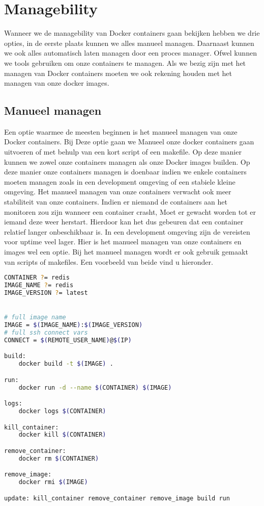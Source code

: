 \chapter{Managebility}

Wanneer we de managebility van Docker containers gaan bekijken hebben we drie opties, in de eerste plaats kunnen we alles manueel managen. Daarnaast kunnen we ook alles automatisch laten managen door een proces manager. Ofwel kunnen we tools gebruiken om onze containers te managen. Als we bezig zijn met het managen van Docker containers moeten we ook rekening houden met het managen van onze docker images. 

\section{Manueel managen}

Een optie waarmee de meesten beginnen is het manueel managen van onze Docker containers. Bij Deze optie gaan we Manueel onze docker containers gaan uitvoeren of met behulp van een kort script of een makefile. Op deze manier kunnen we zowel onze containers managen als onze Docker images builden. Op deze manier onze containers managen is doenbaar indien we enkele containers moeten managen zoals in een development omgeving of een stabiele kleine omgeving. Het manueel managen van onze containers verwacht ook meer stabiliteit van onze containers. Indien er niemand de containers aan het monitoren zou zijn wanneer een container crasht, Moet er gewacht worden tot er iemand deze weer herstart. Hierdoor kan het dus gebeuren dat een container relatief langer onbeschikbaar is. In een development omgeving zijn de vereisten voor uptime veel lager. Hier is het manueel managen van onze containers en images wel een optie. Bij het manueel managen wordt er ook gebruik gemaakt van scripts of makefiles. Een voorbeeld van beide vind u hieronder.

\begin{lstlisting}[language=bash, style=configstyle]
CONTAINER ?= redis
IMAGE_NAME ?= redis
IMAGE_VERSION ?= latest


# full image name
IMAGE = $(IMAGE_NAME):$(IMAGE_VERSION)
# full ssh connect vars
CONNECT = $(REMOTE_USER_NAME)@$(IP)

build:
	docker build -t $(IMAGE) .

run:
	docker run -d --name $(CONTAINER) $(IMAGE)

logs:
	docker logs $(CONTAINER)

kill_container:
	docker kill $(CONTAINER)

remove_container:
	docker rm $(CONTAINER)

remove_image:
	docker rmi $(IMAGE)

update: kill_container remove_container remove_image build run
\end{lstlisting}

